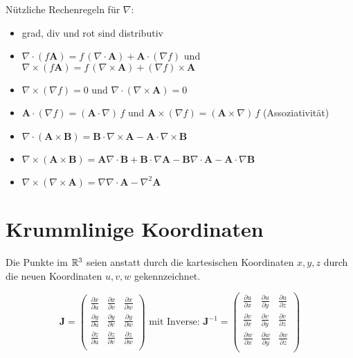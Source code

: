 Nützliche Rechenregeln für $\nabla$:
\begin{itemize}
	\item grad, div und rot sind distributiv
	\item $\nabla \cdot (f \mathbf{A}) = f \, (\nabla \cdot \mathbf{A}) + \mathbf{A} \cdot (\nabla f)$ und $\nabla \times (f \mathbf{A}) = f \, (\nabla \times \mathbf{A}) +  (\nabla f) \times \mathbf{A}$
	\item $\nabla \times (\nabla f) = 0$ und $\nabla \cdot (\nabla \times \mathbf{A}) = 0$
	\item $\mathbf{A} \cdot (\nabla f) = (\mathbf{A} \cdot \nabla) \, f$ und $\mathbf{A} \times (\nabla f) = (\mathbf{A} \times \nabla) \, f$ (Assoziativität)
	\item $\nabla \cdot (\mathbf{A} \times \mathbf{B}) = \mathbf{B} \cdot \nabla \times \mathbf{A} - \mathbf{A} \cdot \nabla \times \mathbf{B}$
	\item $\nabla \times (\mathbf{A} \times \mathbf{B}) = \mathbf{A} \nabla \cdot \mathbf{B} + \mathbf{B} \cdot \nabla \mathbf{A} - \mathbf{B} \nabla \cdot \mathbf{A} - \mathbf{A} \cdot \nabla \mathbf{B}$
	\item $\nabla \times (\nabla \times \mathbf{A}) = \nabla \nabla \cdot \mathbf{A} - \nabla^2 \mathbf{A}$
	
\end{itemize}


\section{Krummlinige Koordinaten}

Die Punkte im $\mathbb{R}^3$ seien anstatt durch die kartesischen Koordinaten $x,y,z$ durch die neuen Koordinaten $u,v,w$ gekennzeichnet.

\begin{frameddefn}
\[
\mathbf{J} =
\left(\begin{array}{rrr} 
	\frac{\partial x}{\partial u} & \frac{\partial x}{\partial v} & \frac{\partial x}{\partial w} \\ 
	\frac{\partial y}{\partial u} & \frac{\partial y}{\partial v} & \frac{\partial y}{\partial w} \\ 
	\frac{\partial z}{\partial u} & \frac{\partial z}{\partial v} & \frac{\partial z}{\partial w} \\ 
\end{array}\right)
\textrm{ mit Inverse: }
\mathbf{J}^{-1} = 
\left(\begin{array}{rrr} 
	\frac{\partial u}{\partial x} & \frac{\partial u}{\partial y} & \frac{\partial u}{\partial z} \\ 
	\frac{\partial v}{\partial x} & \frac{\partial v}{\partial y} & \frac{\partial v}{\partial z} \\ 
	\frac{\partial w}{\partial x} & \frac{\partial w}{\partial y} & \frac{\partial w}{\partial z} \\ 
\end{array}\right)
\]
\end{frameddefn}

